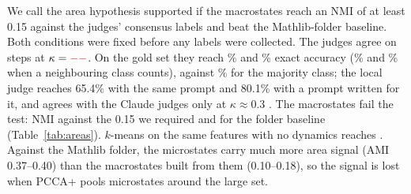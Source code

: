 We call the area hypothesis supported if the macrostates reach an NMI of at
least 0.15 against the judges' consensus labels and beat the Mathlib-folder
baseline. Both conditions were fixed before any labels were collected.
The judges agree on steps at $\kappa = \textcolor{red}{--}$. On the gold set
they reach \resGoldAccHaiku\% and \resGoldAccSonnet\% exact accuracy
(\resGoldFamAccHaiku\% and \resGoldFamAccSonnet\% when a neighbouring class
counts), against \resGoldMajority\% for the majority class; the local judge
reaches 65.4\% with the same prompt and 80.1\% with a prompt written for it,
and agrees with the Claude judges only at $\kappa \approx 0.3$
. The macrostates fail the test:
NMI \resMacroNMI{} against the 0.15 we required and \resFolderNMI{} for the
folder baseline (Table~\ref{tab:areas}). $k$-means on the same features with
no dynamics reaches \resKmeansNMI. Against the Mathlib folder, the
microstates carry much more area signal (AMI 0.37--0.40) than the
macrostates built from them (0.10--0.18), so the signal is lost when PCCA+
pools microstates around the large set.

\begin{table}[t]
  \caption{Agreement with the judges' consensus MSC codes. Brackets are
  95\% bootstrap intervals over proofs; AMI corrects NMI for the number of
  groups. The rows above the second rule are scored on the same labelled
  steps. The folder and namespace rows label each step by its Mathlib folder
  or the first components of its theorem name; the $k$-means rows cluster the
  same goal-state features, or the same microstate centers, into $m$ groups
  with no dynamics; the judges' proof label gives every step the judges'
  own whole-proof label, an oracle; the random partition keeps the
  macrostate sizes. The null rows give the macrostates' mean score when
  their labels are shuffled over all steps, swapped between proofs of the
  same length, or shuffled within each proof, with $p = $ \resNullRowP,
  \resNullProofP{} and \resNullWithinP{} for the observed NMI. The last row scores the synthetic set against its planted
  areas. }
  \label{tab:areas}
  \centering\small
\end{table}

